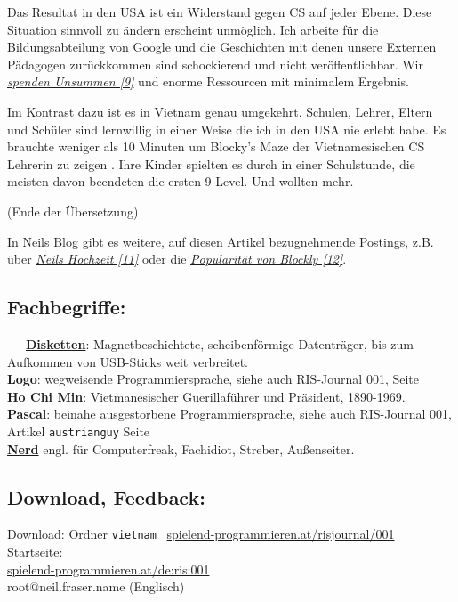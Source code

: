 \documentclass[10pt,a4paper,ngerman,twoside]{article} %
\begin{document}
Das Resultat in den USA ist ein Widerstand gegen CS auf jeder Ebene. Diese Situation sinnvoll zu ändern erscheint unmöglich. Ich arbeite für die Bildungsabteilung von Google und die Geschichten mit denen unsere Externen Pädagogen zurückkommen sind schockierend und nicht veröffentlichbar. Wir \href{http://neil.fraser.name/news/2011/07/16/}{\textit{spenden Unsummen [9]}} und enorme Ressourcen mit minimalem Ergebnis.

Im Kontrast dazu ist es in Vietnam genau umgekehrt. Schulen, Lehrer, Eltern und Schüler sind lernwillig in einer Weise die ich in den USA nie erlebt habe. Es brauchte weniger als 10 Minuten um Blocky's Maze der Vietnamesischen CS Lehrerin zu zeigen . Ihre Kinder spielten es durch in einer Schulstunde, die meisten davon beendeten die ersten 9 Level. Und wollten mehr.

(Ende der Übersetzung)

In Neils Blog gibt es weitere, auf diesen Artikel bezugnehmende Postings, z.B. über \href{https://neil.fraser.name/news/2013/04/15/}{\textit{Neils Hochzeit [11]}} oder die \href{https://neil.fraser.name/news/2013/12/31/}{\textit{Popularität von Blockly [12]}}. 

\subsection*{Fachbegriffe:}

~~~\href{http://de.wikipedia.org/wiki/Diskette}{\textbf{Disketten}}: Magnetbeschichtete, scheibenförmige Datenträger, bis zum Aufkommen von USB-Sticks weit verbreitet. \\

\textbf{Logo}: wegweisende Programmiersprache, siehe auch RIS-Journal 001, Seite \pageref{austrianguy} \\

\textbf{Ho Chi Min}: Vietmanesischer Guerillaführer und Präsident, 1890-1969. \\

\textbf{Pascal}: beinahe ausgestorbene Programmiersprache, siehe auch RIS-Journal 001, Artikel \texttt{austrianguy} Seite \pageref{austrianguy} \\

\href{https://de.wikipedia.org/wiki/Nerd}{\textbf{Nerd}} engl. für Computerfreak, Fachidiot, Streber, Außenseiter.


\subsection*{Download, Feedback:}
\footnotesize{
Download: Ordner \texttt{vietnam} \Mundus\ \href{http://spielend-programmieren.at/risjournal/001}{spielend-programmieren.at/risjournal/001}\\
Startseite:\\
\href{http://spielend-programmieren.at/de:ris:001}{spielend-programmieren.at/de:ris:001}\\ 
\Letter\:  root@neil.fraser.name (Englisch)\\}
\normalsize
 
\end{document}
